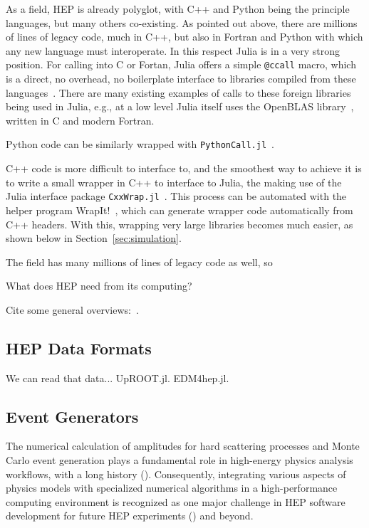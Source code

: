 \documentclass{webofc}
\begin{document}
As a field, HEP is already polyglot, with C++ and Python being the principle
languages, but many others co-existing. As pointed out above, there are millions
of lines of legacy code, much in C++, but also in Fortran and Python with which
any new language must interoperate. In this respect Julia is in a very strong
position. For calling into C or Fortan, Julia offers a simple \texttt{@ccall}
macro, which is a direct, no overhead, no boilerplate interface to libraries
compiled from these languages~\cite{JuliaManualCCall}. There are many existing
examples of calls to these foreign libraries being used in Julia, e.g., at a low
level Julia itself uses the OpenBLAS library~\cite{6877458}, written in C and
modern Fortran. 

Python code can be similarly wrapped with
\texttt{PythonCall.jl}~\cite{PythonCall.jl}.

C++ code is more difficult to interface to, and the smoothest way to achieve it
is to write a small wrapper in C++ to interface to Julia, the making use of the
Julia interface package \texttt{CxxWrap.jl}~\cite{CxxWrap.jl}. This process can
be automated with the helper program WrapIt!~\cite{wrapit-github}, which can
generate wrapper code automatically from C++ headers. With this, wrapping very
large libraries becomes much easier, as shown below in
Section~\ref{sec:simulation}.


The
field has many millions of lines of legacy code as well, so 

What does HEP need from its computing?

Cite some general overviews:~\cite{Stanitzki:2020bnx,eschle2023potential}.

\subsection{HEP Data Formats}

We can read that data... UpROOT.jl. EDM4hep.jl.

\subsection{Event Generators}

The numerical calculation of amplitudes for hard scattering processes and Monte
Carlo event generation plays a fundamental role in high-energy physics analysis
workflows, with a long history (\cite{campbell2024event}). Consequently,
integrating various aspects of physics models with specialized numerical
algorithms in a high-performance computing environment is recognized as one
major challenge in HEP software development for future HEP experiments
(\cite{HEPSoftwareFoundation:2017ggl, HSFPhysicsEventGeneratorWG:2020gxw,
HSFPhysicsEventGeneratorWG:2021xti}) and beyond.
\end{document}
